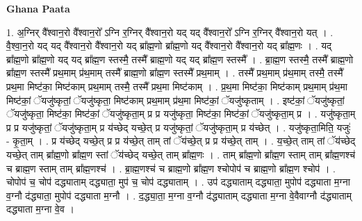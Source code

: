 \documentclass[17pt]{extarticle}
\begin{document}
\textbf{Ghana Paata } \newline

1. अ॒ग्निर् वै᳚श्वान॒रो वै᳚श्वान॒रो᳚ ऽग्नि र॒ग्निर् वै᳚श्वान॒रो यद् यद् वै᳚श्वान॒रो᳚ ऽग्नि र॒ग्निर् वै᳚श्वान॒रो यत् । . वै॒श्वा॒न॒रो यद् यद् वै᳚श्वान॒रो वै᳚श्वान॒रो यद् ब्रा᳚ह्म॒णो ब्रा᳚ह्म॒णो यद् वै᳚श्वान॒रो वै᳚श्वान॒रो यद् ब्रा᳚ह्म॒णः । . यद् ब्रा᳚ह्म॒णो ब्रा᳚ह्म॒णो यद् यद् ब्रा᳚ह्म॒ण स्तस्मै॒ तस्मै᳚ ब्राह्म॒णो यद् यद् ब्रा᳚ह्म॒ण स्तस्मै᳚ । . ब्रा॒ह्म॒ण स्तस्मै॒ तस्मै᳚ ब्राह्म॒णो ब्रा᳚ह्म॒ण स्तस्मै᳚ प्रथ॒माम् प्र॑थ॒माम् तस्मै᳚ ब्राह्म॒णो ब्रा᳚ह्म॒ण स्तस्मै᳚ प्रथ॒माम् । . तस्मै᳚ प्रथ॒माम् प्र॑थ॒माम् तस्मै॒ तस्मै᳚ प्रथ॒मा मिष्ट॑का॒ मिष्ट॑काम् प्रथ॒माम् तस्मै॒ तस्मै᳚ प्रथ॒मा मिष्ट॑काम् । . प्र॒थ॒मा मिष्ट॑का॒ मिष्ट॑काम् प्रथ॒माम् प्र॑थ॒मा मिष्ट॑कां॒ ॅयजु॑ष्कृतां॒ ॅयजु॑ष्कृता॒ मिष्ट॑काम् प्रथ॒माम् प्र॑थ॒मा मिष्ट॑कां॒ ॅयजु॑ष्कृताम् । . इष्ट॑कां॒ ॅयजु॑ष्कृतां॒ ॅयजु॑ष्कृता॒ मिष्ट॑का॒ मिष्ट॑कां॒ ॅयजु॑ष्कृता॒म् प्र प्र यजु॑ष्कृता॒ मिष्ट॑का॒ मिष्ट॑कां॒ ॅयजु॑ष्कृता॒म् प्र । . यजु॑ष्कृता॒म् प्र प्र यजु॑ष्कृतां॒ ॅयजु॑ष्कृता॒म् प्र य॑च्छेद् यच्छे॒त् प्र यजु॑ष्कृतां॒ ॅयजु॑ष्कृता॒म् प्र य॑च्छेत् । . यजु॑ष्कृता॒मिति॒ यजुः॑ - कृ॒ता॒म् । . प्र य॑च्छेद् यच्छे॒त् प्र प्र य॑च्छे॒त् ताम् तां ॅय॑च्छे॒त् प्र प्र य॑च्छे॒त् ताम् । . य॒च्छे॒त् ताम् तां ॅय॑च्छेद् यच्छे॒त् ताम् ब्रा᳚ह्म॒णो ब्रा᳚ह्म॒ण स्तां ॅय॑च्छेद् यच्छे॒त् ताम् ब्रा᳚ह्म॒णः । . ताम् ब्रा᳚ह्म॒णो ब्रा᳚ह्म॒ण स्ताम् ताम् ब्रा᳚ह्म॒णश्च॑ च ब्राह्म॒ण स्ताम् ताम् ब्रा᳚ह्म॒णश्च॑ । . ब्रा॒ह्म॒णश्च॑ च ब्राह्म॒णो ब्रा᳚ह्म॒ण श्चोपोप॑ च ब्राह्म॒णो ब्रा᳚ह्म॒ण श्चोप॑ । . चोपोप॑ च॒ चोप॑ दद्ध्याताम् दद्ध्याता॒ मुप॑ च॒ चोप॑ दद्ध्याताम् । . उप॑ दद्ध्याताम् दद्ध्याता॒ मुपोप॑ दद्ध्याता म॒ग्ना व॒ग्नौ द॑द्ध्याता॒ मुपोप॑ दद्ध्याता म॒ग्नौ । . द॒द्ध्या॒ता॒ म॒ग्ना व॒ग्नौ द॑द्ध्याताम् दद्ध्याता म॒ग्ना वे॒वैवाग्नौ द॑द्ध्याताम् दद्ध्याता म॒ग्ना वे॒व । \newline
\end{document}
